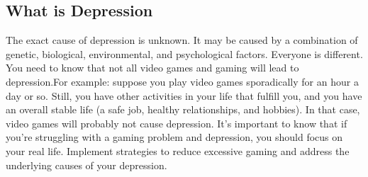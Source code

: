 \documentclass[10pt,twoside,slovak,a4paper]{article}
\begin{document}
\subsection{What is Depression } \label{ina:este}
The exact cause of depression is unknown. It may be caused by a combination of genetic, biological, environmental, and psychological factors. Everyone is different. You need to know that not all video games and gaming will lead to depression.\newline For example: suppose you play video games sporadically for an hour a day or so. Still, you have other activities in your life that fulfill you, and you have an overall stable life (a safe job, healthy relationships, and hobbies). In that case, video games will probably not cause depression. It's important to know that if you're struggling with a gaming problem and depression, you should focus on your real life. Implement strategies to reduce excessive gaming and address the underlying causes of your depression.




 
\end{document}
